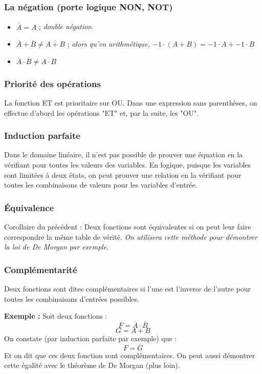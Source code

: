 \documentclass[a4paper,11pt]{book}
\theoremstyle{definition}
\theoremstyle{definition}
\begin{document}
\subsubsection{La négation (porte logique NON, NOT)}
\begin{itemize}
    \item $\overline{\overline{A}} = A$ ; \emph{double négation}
    \item $\overline{A} + \overline{B} \neq \overline{A + B}$ ; \emph{alors qu'en arithmétique, $-1 \cdot (A + B) = -1 \cdot A + -1 \cdot B$}
    \item $\overline{A}\cdot\overline{B} \neq \overline{A\cdot B} $
\end{itemize}

\subsubsection{Priorité des opérations}
La fonction ET est prioritaire sur OU. Dans une expression sans parenthèses, on effectue d'abord les opérations "ET" et, par la
suite, les "OU".
\subsubsection{Induction parfaite}
Dans le domaine linéaire, il n'est pas possible de prouver une équation en la vérifiant pour toutes les valeurs des variables. En logique, puisque les variables sont limitées à deux états, on peut prouver une relation en la vérifiant pour toutes les combinaisons de valeurs pour les variables d'entrée.
\subsubsection{Équivalence}
Corollaire du précédent : Deux fonctions sont équivalentes si on peut leur faire correspondre la même table de vérité.
\emph{On utilisera cette méthode pour démontrer la loi de De Morgan par exemple}.
\subsubsection{Complémentarité}
Deux fonctions sont dites complémentaires si l'une est l'inverse de l'autre pour toutes les combinaisons d'entrées possibles.

\textbf{Exemple :}
Soit deux fonctions :
\[ F = \overline{A} \cdot \overline{B}\]
\[ G = A + B\]
On constate (par induction parfaite par exemple) que :
\[ F = \overline{G}\]
Et on dit que ces deux fonction sont complémentaires.
On peut aussi démontrer cette égalité avec le théorème de De Morgan (plus loin).
\end{document}

